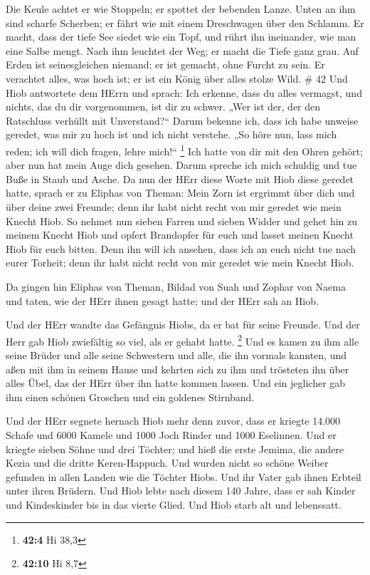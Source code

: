 Die Keule achtet er wie Stoppeln; er spottet der bebenden Lanze.
 Unten an ihm sind scharfe Scherben; er fährt wie mit einem
Dreschwagen über den Schlamm.  Er macht, dass der tiefe See
siedet wie ein Topf, und rührt ihn ineinander, wie man eine Salbe mengt.
 Nach ihm leuchtet der Weg; er macht die Tiefe ganz grau.
 Auf Erden ist seinesgleichen niemand; er ist gemacht, ohne
Furcht zu sein.  Er verachtet alles, was hoch ist; er ist
ein König über alles stolze Wild. \# 42  Und Hiob antwortete
dem HErrn und sprach:  Ich erkenne, dass du alles vermagst,
und nichts, das du dir vorgenommen, ist dir zu schwer.  „Wer
ist der, der den Ratschluss verhüllt mit Unverstand?{}`` Darum bekenne
ich, dass ich habe unweise geredet, was mir zu hoch ist und ich nicht
verstehe.  „So höre nun, lass mich reden; ich will dich
fragen, lehre mich!{}`` \footnote{\textbf{42:4} Hi 38,3} 
Ich hatte von dir mit den Ohren gehört; aber nun hat mein Auge dich
gesehen.  Darum spreche ich mich schuldig und tue Buße in
Staub und Asche.  Da nun der HErr diese Worte mit Hiob diese
geredet hatte, sprach er zu Eliphas von Theman: Mein Zorn ist ergrimmt
über dich und über deine zwei Freunde; denn ihr habt nicht recht von mir
geredet wie mein Knecht Hiob.  So nehmet nun sieben Farren
und sieben Widder und gehet hin zu meinem Knecht Hiob und opfert
Brandopfer für euch und lasset meinen Knecht Hiob für euch bitten. Denn
ihn will ich ansehen, dass ich an euch nicht tue nach eurer Torheit;
denn ihr habt nicht recht von mir geredet wie mein Knecht Hiob.

 Da gingen hin Eliphas von Theman, Bildad von Suah und
Zophar von Naema und taten, wie der HErr ihnen gesagt hatte; und der
HErr sah an Hiob.

 Und der HErr wandte das Gefängnis Hiobs, da er bat für
seine Freunde. Und der Herr gab Hiob zwiefältig so viel, als er gehabt
hatte. \footnote{\textbf{42:10} Hi 8,7}  Und es kamen zu
ihm alle seine Brüder und alle seine Schwestern und alle, die ihn
vormals kannten, und aßen mit ihm in seinem Hause und kehrten sich zu
ihm und trösteten ihn über alles Übel, das der HErr über ihn hatte
kommen lassen. Und ein jeglicher gab ihm einen schönen Groschen und ein
goldenes Stirnband.

 Und der HErr segnete hernach Hiob mehr denn zuvor, dass er
kriegte 14.000 Schafe und 6000 Kamele und 1000 Joch Rinder und 1000
Eselinnen.  Und er kriegte sieben Söhne und drei Töchter;
 und hieß die erste Jemima, die andere Kezia und die dritte
Keren-Happuch.  Und wurden nicht so schöne Weiber gefunden
in allen Landen wie die Töchter Hiobs. Und ihr Vater gab ihnen Erbteil
unter ihren Brüdern.  Und Hiob lebte nach diesem 140 Jahre,
dass er sah Kinder und Kindeskinder bis in das vierte Glied.
 Und Hiob starb alt und lebenssatt.
